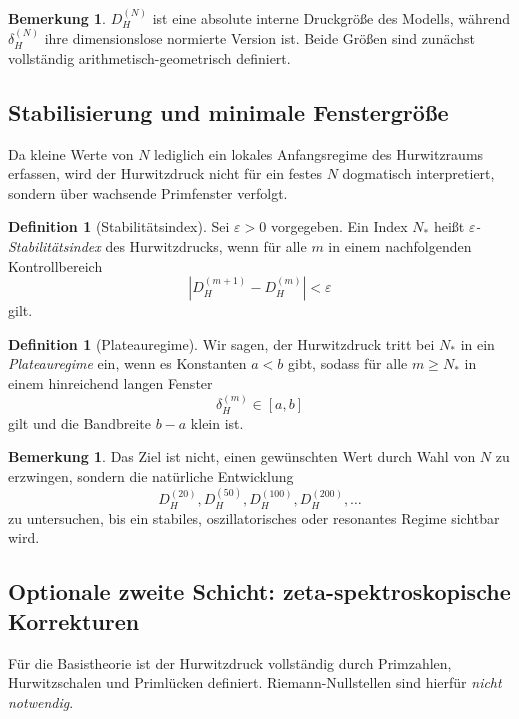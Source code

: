 \documentclass[12pt,a4paper]{article}
\theoremstyle{definition}
\newtheorem{definition}[satz]{Definition}
\newtheorem{bemerkung}[satz]{Bemerkung}
\begin{document}
	\begin{bemerkung}
		\(D_H^{(N)}\) ist eine absolute interne Druckgröße des Modells, während \(\delta_H^{(N)}\) ihre dimensionslose normierte Version ist. Beide Größen sind zunächst vollständig arithmetisch-geometrisch definiert.
	\end{bemerkung}
	
	\subsection{Stabilisierung und minimale Fenstergröße}
	
	Da kleine Werte von \(N\) lediglich ein lokales Anfangsregime des Hurwitzraums erfassen, wird der Hurwitzdruck nicht für ein festes \(N\) dogmatisch interpretiert, sondern über wachsende Primfenster verfolgt.
	
	\begin{definition}[Stabilitätsindex]
		Sei \(\varepsilon>0\) vorgegeben. Ein Index \(N_\ast\) heißt \emph{\(\varepsilon\)-Stabilitätsindex} des Hurwitzdrucks, wenn für alle \(m\) in einem nachfolgenden Kontrollbereich
		\[
		|D_H^{(m+1)}-D_H^{(m)}|<\varepsilon
		\]
		gilt.
	\end{definition}
	
	\begin{definition}[Plateauregime]
		Wir sagen, der Hurwitzdruck tritt bei \(N_\ast\) in ein \emph{Plateauregime} ein, wenn es Konstanten \(a<b\) gibt, sodass für alle \(m\ge N_\ast\) in einem hinreichend langen Fenster
		\[
		\delta_H^{(m)}\in[a,b]
		\]
		gilt und die Bandbreite \(b-a\) klein ist.
	\end{definition}
	
	\begin{bemerkung}
		Das Ziel ist nicht, einen gewünschten Wert durch Wahl von \(N\) zu erzwingen, sondern die natürliche Entwicklung
		\[
		D_H^{(20)},D_H^{(50)},D_H^{(100)},D_H^{(200)},\dots
		\]
		zu untersuchen, bis ein stabiles, oszillatorisches oder resonantes Regime sichtbar wird.
	\end{bemerkung}
	
	\subsection{Optionale zweite Schicht: zeta-spektroskopische Korrekturen}
	
	Für die Basistheorie ist der Hurwitzdruck vollständig durch Primzahlen, Hurwitzschalen und Primlücken definiert. Riemann-Nullstellen sind hierfür \emph{nicht notwendig}.
	
\end{document}
